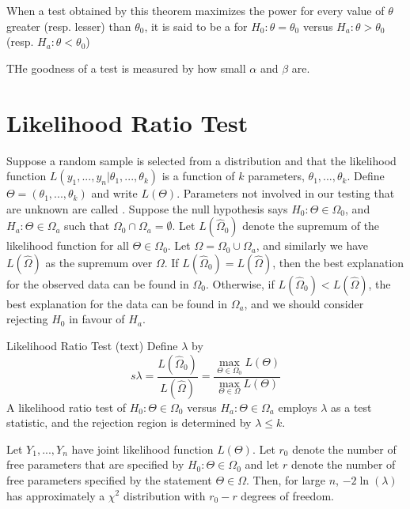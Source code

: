 \documentclass[12pt, a4paper, twoside, openright, titlepage]{book}
\begin{document}
\begin{rmk}{}{}
    When a test obtained by this theorem maximizes the power for every value of $\theta$ greater (resp. lesser) than $\theta_0$, it is said to be a  for $H_0:\theta = \theta_0$ versus $H_a: \theta> \theta_0$ (resp. $H_a:\theta < \theta_0$)
\end{rmk}

\begin{rmk}{}{}
    THe goodness of a test is measured by how small $\alpha$ and $\beta$ are.
\end{rmk}


\section{\textsection Likelihood Ratio Test}

Suppose a random sample is selected from a distribution and that the likelihood function $L(y_1,...,y_n\vert\theta_1,...,\theta_k)$ is a function of $k$ parameters, $\theta_1,...,\theta_k$. Define $\Theta = (\theta_1,...,\theta_k)$ and write $L(\Theta)$. Parameters not involved in our testing that are unknown are called . Suppose the null hypothesis says $H_0:\Theta \in \Omega_0$, and $H_a:\Theta \in \Omega_a$ such that $\Omega_0\cap \Omega_a = \emptyset$. Let $L(\hat{\Omega}_0)$ denote the supremum of the likelihood function for all $\Theta \in \Omega_0$. Let $\Omega = \Omega_0\cup\Omega_a$, and similarly we have $L(\hat{\Omega})$ as the supremum over $\Omega$. If $L(\hat{\Omega}_0) = L(\hat{\Omega})$, then the best explanation for the observed data can be found in $\Omega_0$. Otherwise, if $L(\hat{\Omega}_0) < L(\hat{\Omega})$, the best explanation for the data can be found in $\Omega_a$, and we should consider rejecting $H_0$ in favour of $H_a$.


\begin{namthm}{Likelihood Ratio Test (text)}{}
    Define $\lambda$ by \begin{equation*}
    s    \lambda = \frac{L(\hat{\Omega}_0)}{L(\hat{\Omega})} = \frac{\max_{\Theta \in \Omega_0}L(\Theta)}{\max_{\Theta \in \Omega}L(\Theta)}
    \end{equation*}
    A likelihood ratio test of $H_0:\Theta \in \Omega_0$ versus $H_a:\Theta \in \Omega_a$ employs $\lambda$ as a test statistic, and the rejection region is determined by $\lambda \leq k$.
\end{namthm}

\begin{thm}{}{}
    Let $Y_1,...,Y_n$ have joint likelihood function $L(\Theta)$. Let $r_0$ denote the number of free parameters that are specified by $H_0: \Theta \in \Omega_0$ and let $r$ denote the number of free parameters specified by the statement $\Theta \in \Omega$. Then, for large $n$, $-2\ln(\lambda)$ has approximately a $\chi^2$ distribution with $r_0 - r$ degrees of freedom.
\end{thm}
\end{document}
